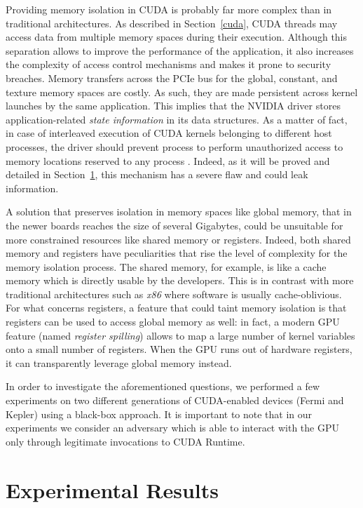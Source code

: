 \documentclass[11pt,onecolumn,letterpaper]{IEEEtran}
\begin{document}
Providing memory isolation in CUDA is probably far more complex than in traditional architectures.
As described in Section~\ref{cuda}, CUDA threads may access data from multiple memory spaces during their execution.
Although this separation allows to improve the performance of the application,
it also increases the complexity of access control mechanisms and makes it prone to security breaches.
Memory transfers across the PCIe bus for the global, constant, and texture memory spaces are costly.
As such, they are made persistent across kernel launches by the same application.
This implies that the NVIDIA driver stores application-related \emph{state information} in its data structures.
As a matter of fact, in case of interleaved execution of CUDA kernels belonging to different host processes,
the driver should prevent process  to perform unauthorized access to memory locations reserved to any process .
Indeed, as it will be proved and detailed in Section~\ref{experimental}, this mechanism has a severe flaw and could leak information.

A solution that preserves isolation in memory spaces like global memory,
that in the newer boards reaches the size of several Gigabytes, 
could be unsuitable for more constrained resources like shared memory or registers.
Indeed, both shared memory and registers have peculiarities that rise the level of complexity for the memory isolation process.
The shared memory, for example, is like a cache memory which is directly usable by the developers. 
This is in contrast with more traditional architectures such as \emph{x86} where software is usually cache-oblivious.
For what concerns registers, a feature that could taint memory isolation is that registers can be used to access global memory as well:
in fact, a modern GPU feature (named \emph{register spilling}) allows to map a large number of kernel variables onto a small number of registers.
When the GPU runs out of hardware registers, it can transparently leverage global memory instead.

In order to investigate the aforementioned questions, we performed a few experiments on two different
generations of CUDA-enabled devices (Fermi and Kepler) using a black-box approach.
It is important to note that in our experiments we consider an adversary which is able to interact
with the GPU only through legitimate invocations to CUDA Runtime.

\section{Experimental Results}
\label{experimental}
\end{document}
